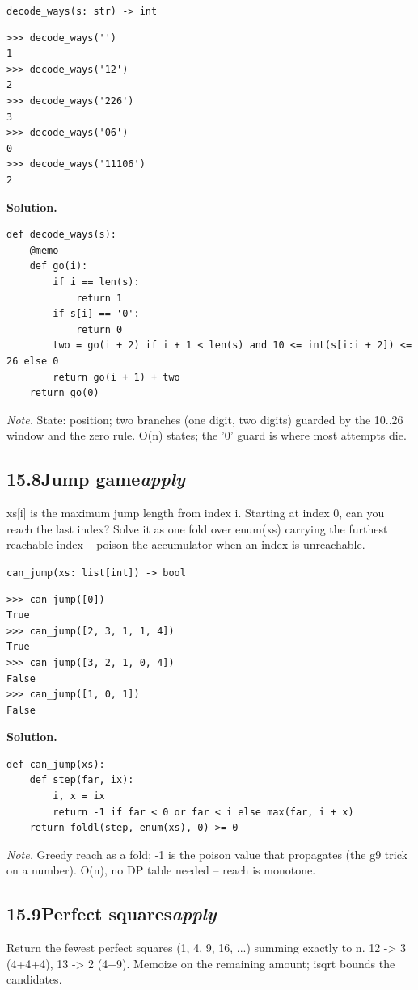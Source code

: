\documentclass[10pt,letterpaper]{book}
\begin{document}
\noindent\texttt{decode\_ways(s: str) -> int}
\begin{lstlisting}[style=ex]
>>> decode_ways('')
1
>>> decode_ways('12')
2
>>> decode_ways('226')
3
>>> decode_ways('06')
0
>>> decode_ways('11106')
2
\end{lstlisting}
\noindent\textbf{Solution.}
\begin{lstlisting}[style=code]
def decode_ways(s):
    @memo
    def go(i):
        if i == len(s):
            return 1
        if s[i] == '0':
            return 0
        two = go(i + 2) if i + 1 < len(s) and 10 <= int(s[i:i + 2]) <= 26 else 0
        return go(i + 1) + two
    return go(0)
\end{lstlisting}
\noindent\textit{Note.} State: position; two branches (one digit, two digits) guarded by the 10..26 window and the zero rule. O(n) states; the '0' guard is where most attempts die.

\subsection*{15.8\quad Jump game\hfill\textnormal{\textit{apply}}}
xs[i] is the maximum jump length from index i. Starting at index 0, can you reach the last index? Solve it as one fold over enum(xs) carrying the furthest reachable index -- poison the accumulator when an index is unreachable.

\noindent\texttt{can\_jump(xs: list[int]) -> bool}
\begin{lstlisting}[style=ex]
>>> can_jump([0])
True
>>> can_jump([2, 3, 1, 1, 4])
True
>>> can_jump([3, 2, 1, 0, 4])
False
>>> can_jump([1, 0, 1])
False
\end{lstlisting}
\noindent\textbf{Solution.}
\begin{lstlisting}[style=code]
def can_jump(xs):
    def step(far, ix):
        i, x = ix
        return -1 if far < 0 or far < i else max(far, i + x)
    return foldl(step, enum(xs), 0) >= 0
\end{lstlisting}
\noindent\textit{Note.} Greedy reach as a fold; -1 is the poison value that propagates (the g9 trick on a number). O(n), no DP table needed -- reach is monotone.

\subsection*{15.9\quad Perfect squares\hfill\textnormal{\textit{apply}}}
Return the fewest perfect squares (1, 4, 9, 16, ...) summing exactly to n. 12 -> 3 (4+4+4), 13 -> 2 (4+9). Memoize on the remaining amount; isqrt bounds the candidates.
\end{document}

